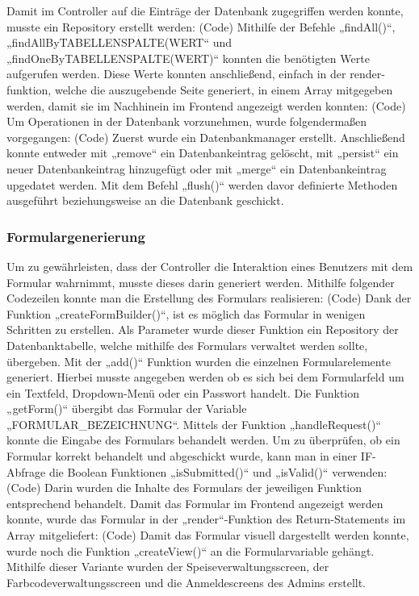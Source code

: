 Damit im Controller auf die Einträge der Datenbank zugegriffen werden konnte, musste ein Repository erstellt werden: 
(Code)
Mithilfe der Befehle „findAll()“, „findAllByTABELLENSPALTE(WERT“ und „findOneByTABELLENSPALTE(WERT)“ konnten die benötigten Werte aufgerufen werden. 
Diese Werte konnten anschließend, einfach in der render-funktion, welche die auszugebende Seite generiert, in einem Array mitgegeben werden, damit sie im Nachhinein im Frontend angezeigt werden konnten:
(Code)
Um Operationen in der Datenbank vorzunehmen, wurde folgendermaßen vorgegangen:
(Code)
Zuerst wurde ein Datenbankmanager erstellt. Anschließend konnte entweder mit „remove“ ein Datenbankeintrag gelöscht, mit „persist“ ein neuer Datenbankeintrag hinzugefügt oder mit „merge“ ein Datenbankeintrag upgedatet werden. Mit dem Befehl „flush()“ werden davor definierte Methoden ausgeführt beziehungsweise an die Datenbank geschickt.  

    \subsubsection{Formulargenerierung}
    
Um zu gewährleisten, dass der Controller die Interaktion eines Benutzers mit dem Formular wahrnimmt, musste dieses darin generiert werden. Mithilfe folgender Codezeilen konnte man die Erstellung des Formulars realisieren:
(Code)
Dank der Funktion „createFormBuilder()“, ist es möglich das Formular in wenigen Schritten zu erstellen. Als Parameter wurde dieser Funktion ein Repository der Datenbanktabelle, welche mithilfe des Formulars verwaltet werden sollte, übergeben. Mit der „add()“ Funktion wurden die einzelnen Formularelemente generiert. Hierbei musste angegeben werden ob es sich bei dem Formularfeld um ein Textfeld, Dropdown-Menü oder ein Passwort handelt. Die Funktion „getForm()“ übergibt das Formular der Variable „FORMULAR_BEZEICHNUNG“.
Mittels der Funktion „handleRequest()“ konnte die Eingabe des Formulars behandelt werden. Um zu überprüfen, ob ein Formular korrekt behandelt und abgeschickt wurde, kann man in einer IF-Abfrage die Boolean Funktionen „isSubmitted()“ und „isValid()“ verwenden:
(Code)
Darin wurden die Inhalte des Formulars der jeweiligen Funktion entsprechend behandelt. 
Damit das Formular im Frontend angezeigt werden konnte, wurde das Formular in der „render“-Funktion des Return-Statements im Array mitgeliefert:
(Code)
Damit das Formular visuell dargestellt werden konnte, wurde noch die Funktion „createView()“ an die Formularvariable gehängt.
Mithilfe dieser Variante wurden der Speiseverwaltungsscreen, der Farbcodeverwaltungsscreen und die Anmeldescreens des Admins erstellt. 


